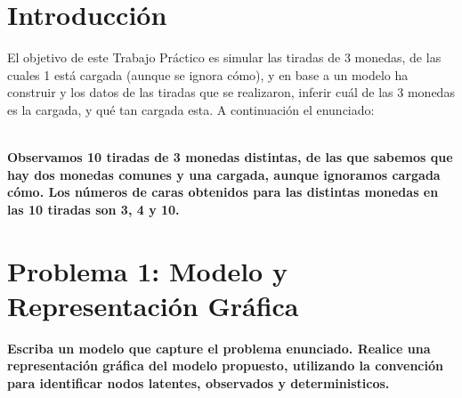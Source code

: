 \section{Introducción}

El objetivo de este Trabajo Práctico es simular las tiradas de 3 monedas, de las cuales 1 está cargada (aunque se ignora cómo), y en base a un modelo ha construir y los datos de las tiradas que se realizaron,
inferir cuál de las 3 monedas es la cargada, y qué tan cargada esta. A continuación el enunciado:

~\\
\textbf{Observamos 10 tiradas de 3 monedas distintas, de las que sabemos que hay dos monedas comunes y una cargada, aunque ignoramos cargada cómo. Los números de caras obtenidos para las distintas
monedas en las 10 tiradas son 3, 4 y 10.}


\section{Problema 1: Modelo y Representación Gráfica}

\textbf{Escriba un modelo que capture el problema enunciado. Realice una representación gráfica del modelo propuesto, utilizando la convención para identificar
nodos latentes, observados y deterministicos.}



